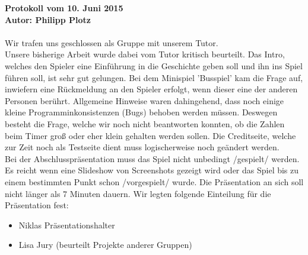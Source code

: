 \documentclass[a4paper,10pt]{article}
\begin{document}
{\bfseries \large Protokoll vom 10. Juni 2015 \\[1mm]		%
\normalfont Autor: Philipp Plotz}					%

\paragraph{}
Wir trafen uns geschlossen als Gruppe mit unserem Tutor.\\
Unsere bisherige Arbeit wurde dabei vom Tutor kritisch beurteilt. Das Intro, welches den Spieler eine Einführung in die Geschichte geben soll und ihn ins Spiel führen soll, ist sehr gut gelungen. Bei dem Minispiel 'Busspiel' kam die Frage auf, inwiefern eine Rückmeldung an den Spieler erfolgt, wenn dieser eine der anderen Personen berührt. Allgemeine Hinweise waren dahingehend, dass noch einige kleine Programminkonsistenzen (Bugs) behoben werden müssen. Deswegen besteht die Frage, welche wir noch nicht beantworten konnten, ob die Zahlen beim Timer groß oder eher klein gehalten werden sollen. Die Creditseite, welche zur Zeit noch als Testseite dient muss logischerweise noch geändert werden.\\
Bei der Abschlusspräsentation muss das Spiel nicht unbedingt /gespielt/ werden. Es reicht wenn eine Slideshow von Screenshots gezeigt wird oder das Spiel bis zu einem bestimmten Punkt schon /vorgespielt/ wurde. Die Präsentation an sich soll nicht länger als 7 Minuten dauern. Wir legten folgende Einteilung für die Präsentation fest:
\begin{itemize}

        \item Niklas Präsentationshalter
        \item Lisa Jury (beurteilt Projekte anderer Gruppen)

\end{itemize}
\end{document}
